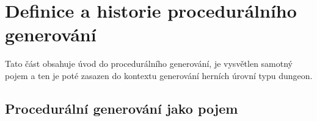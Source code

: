 
\section{Definice a historie procedurálního generování}


Tato část obsahuje úvod do procedurálního generování, je vysvětlen samotný pojem a ten je poté zasazen do kontextu generování herních úrovní typu dungeon.


\subsection{Procedurální generování jako pojem}


